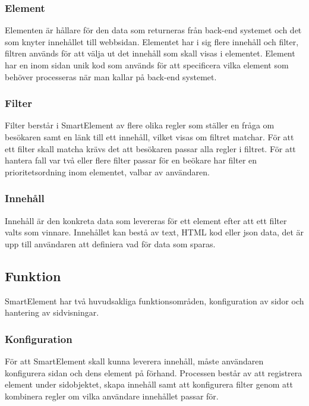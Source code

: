 \subsubsection{Element}

Elementen är hållare för den data som returneras från back-end systemet och det som knyter innehållet till webbsidan. Elementet har i sig flere innehåll och filter, filtren används för att välja ut det innehåll som skall visas i elementet. Element har en inom sidan unik kod som används för att specificera vilka element som behöver processeras när man kallar på back-end systemet.

\subsubsection{Filter}

Filter berstår i SmartElement av flere olika regler som ställer en fråga om besökaren samt en länk till ett innehåll, vilket visas om filtret matchar. För att ett filter skall matcha krävs det att besökaren passar alla regler i filtret. För att hantera fall var två eller flere filter passar för en beökare har filter en prioritetsordning inom elementet, valbar av användaren.

\subsubsection{Innehåll}

Innehåll är den konkreta data som levereras för ett element efter att ett filter valts som vinnare. Innehållet kan bestå av text, HTML kod eller \gls{json} data, det är upp till användaren att definiera vad för data som sparas.

\subsection{Funktion}

SmartElement har två huvudsakliga funktionsområden, konfiguration av sidor och hantering av sidvisningar.

\subsubsection{Konfiguration}

För att SmartElement skall kunna leverera innehåll, måste användaren konfigurera sidan och dens element på förhand. Processen består av att registrera element under sidobjektet, skapa innehåll samt att konfigurera filter genom att kombinera regler om vilka användare innehållet passar för.

